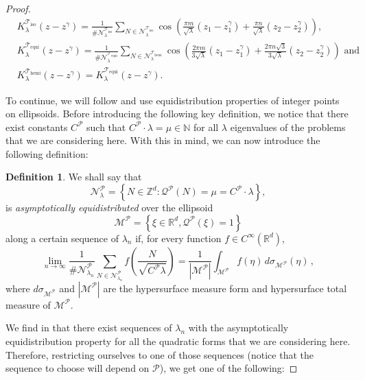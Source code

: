 \documentclass{amsart}
\theoremstyle{definition}
\newtheorem{definition}[theorem]{Definition}
\theoremstyle{remark}
\newcommand{\si}{\sigma}
\def\RR{\mathbb{R}}
\numberwithin{equation}{section}
\theoremstyle{definition}
\theoremstyle{remark}
\def\RR{\mathbb{R}}
\begin{document}
\begin{proof}
\begin{equation}
\begin{aligned}
			&	K_{\lambda}^{\mathcal{T}_\mathrm{iso}}(z-z^\gamma)=\frac{1}{\#\mathcal{N}_\lambda^{\mathcal{T}_\mathrm{iso}}}\sum_{N\in\mathcal{N}_\lambda^{\mathcal{T}_\mathrm{iso}}}\cos\left(\frac{\pi m}{\sqrt{\lambda}}(z_1-z^\gamma_1)+\frac{\pi n}{\sqrt{\lambda}}(z_2-z^\gamma_2)\right),\\
			&	K_{\lambda}^{\mathcal{T}_\mathrm{equi}}(z-z^\gamma)=\frac{1}{\#\mathcal{N}_\lambda^{\mathcal{T}_\mathrm{equi}}}\sum_{N\in\mathcal{N}_\lambda^{\mathcal{T}_\mathrm{hemi}}}\cos\left(\frac{2\pi m}{3\sqrt{\lambda}}(z_1-z^\gamma_1)+\frac{2\pi n\sqrt{3}}{3\sqrt{\lambda}}(z_2-z^\gamma_2)\right)\text{ and }\\&K_{\lambda}^{\mathcal{T}_\mathrm{hemi}}(z-z^\gamma)=K_{\lambda}^{\mathcal{T}_\mathrm{equi}}(z-z^\gamma).
		\end{aligned}
	\end{equation}
	
	To continue, we will follow \cite{ILtori} and use equidistribution properties of integer points on ellipsoids. Before introducing the following key definition, we notice that there exist constants $C^\mathcal{P}$ such that $C^\mathcal{P}\cdot\lambda=\mu\in\mathbb{N}$ for all $\lambda$ eigenvalues of the problems that we are considering here. With this in mind, we can now introduce the following definition:\begin{definition}\label{aequid}
		We shall say that
		\begin{equation}
			\mathcal{N}^\mathcal{P}_\lambda=\left\{N\in\mathbb{Z}^d: \mathcal{Q}^\mathcal{P}(N)=\mu=C^\mathcal{P}\cdot\lambda\right\},
		\end{equation}
		is {\em asymptotically equidistributed}\/ over the ellipsoid
		\begin{equation}\label{defcE}
			\mathcal{M}^{\mathcal{P}}=\left\{\xi\in\mathbb{R}^d, \mathcal{Q}^{\mathcal{P}}(\xi)=1\right\}
		\end{equation}
		along a certain sequence of $\lambda_n$ if, for every function $f\in C^\infty(\RR^d)$,
		\begin{equation}
			\lim_{n\to\infty}\frac1{\#	\mathcal{N}^\mathcal{P}_{\lambda_n}}\sum_{N\in	\mathcal{N}^\mathcal{P}_{\lambda_n}} f\left(\frac{N}{\sqrt{C^\mathcal{P}\lambda}}\right) = \frac1{\left|	\mathcal{M}^{\mathcal{P}}\right|} \int_{	\mathcal{M}^{\mathcal{P}}} f(\eta)\, d\si_{	\mathcal{M}^{\mathcal{P}}}(\eta)\,,
		\end{equation}
		where $d\sigma_{	\mathcal{M}^{\mathcal{P}}}$ and $\left|	\mathcal{M}^{\mathcal{P}}\right|$ are the hypersurface measure form and hypersurface total measure of $	\mathcal{M}^{\mathcal{P}}$.
	\end{definition} We find in \cite{Iwaniek,Cill} that there exist sequences of $\lambda_n$ with the asymptotically equidistribution property for all the quadratic forms that we are considering here. Therefore, restricting ourselves to one of those sequences (notice that the sequence to choose will depend on $\mathcal{P}$), we get one of the following:
	

\end{proof}
\end{document}
